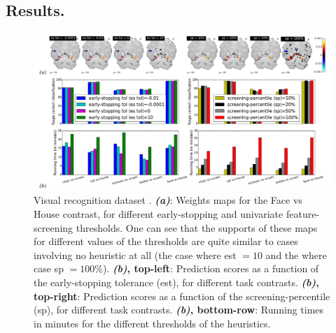 \subsection{Results.}
 \begin{figure}[!htb]
   \includegraphics[width=1\linewidth]{figures/screening_weights_haxby.png}
  \caption{Predicting age from gray-matter concentration maps from the
    OASIS dataset \citep{marcus2007open}. \textbf{Top}:
    Weights maps (solutions to problem \eqref{eq:opt_pb}).
\textbf{Bottom-left}: Mean Square Error (MSE) in age prediction, for
different subjects of the validation set, for  varying levels of the
early-stopping tolerance (``es tol'' for short), with the
screening-percentile (sp) held constant at 100
(full-brain). \textbf{Bottom-right}: MSE in age prediction, for
varying levels of the screening-percentile (sp). \textbf{Running
  times}: Increasing \textit{est tol} (from $-10^{-4}$ to $10$): \textbf{100.2m, 171.4m, 188.8m, 289.6m}. For
increasing $sp$ ($10$ to $100$): \textbf{44.2m, 81.3m, 186.5m, 341.3m}}   
  \caption{Visual recognition dataset
    \citep{haxby2001}. \textbf{\textit{(a)}}: Weights maps
    for the Face vs House contrast,
    for different early-stopping and univariate feature-screening
    thresholds. One can see that the supports of these maps for
    different values of the thresholds are quite similar to cases
    involving  no heuristic at all (the case where est $= 10$ and the
    where case sp $=100\%$).
    \textbf{\textit{(b)}, top-left}: Prediction scores as a function of
    the early-stopping tolerance (est), for different task contrasts.
    \textbf{\textit{(b)}, top-right}: Prediction scores as a function of
    the screening-percentile (sp), for different task contrasts.
    \textbf{\textit{(b)}, bottom-row}: Running times in minutes for the
    different thresholds of the heuristics.
  }
  \label{fig:haxby}
\end{figure}
    

